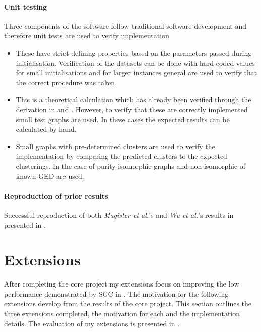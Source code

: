 \paragraph{Unit testing}
Three components of the software follow traditional software development and therefore unit tests are used to verify implementation
\begin{itemize}
    \item[] 
        These have strict defining properties based on the parameters passed during initialisation.
        Verification of the datasets can be done with hard-coded values for small initialisations and
        for larger instances general are
        used to verify that the correct procedure was taken.
    \item[] 
        This is a theoretical calculation which
        has already been verified through the derivation in  and .
        However, to verify that these are correctly implemented
        small test graphs are used.
        In these cases the expected results can be calculated by hand.
    \item[] 
        Small graphs with pre-determined clusters are used to verify the implementation by comparing the predicted clusters to the expected clusterings.
        In the case of purity isomorphic graphs and non-isomorphic of known GED are used.
\end{itemize}

\paragraph{Reproduction of prior results}
Successful reproduction of both \textit{Magister et al.}\cite{magister2021gcexplainer}'s and \textit{Wu et al.}\cite{wu2019simplifying}'s results in presented in .

\section{Extensions}
\label{sec:extensions-imp}
After completing the core project my extensions focus on improving the low performance demonstrated by SGC in .
The motivation for the following extensions develop from the results of the core project.
This section outlines the three extensions completed, the motivation for each and the implementation details.
The evaluation of my extensions is presented in .

